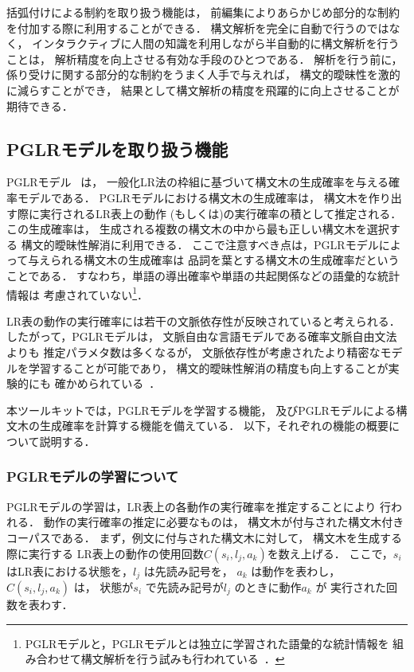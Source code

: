 括弧付けによる制約を取り扱う機能は，
前編集によりあらかじめ部分的な制約を付加する際に利用することができる．
構文解析を完全に自動で行うのではなく，
インタラクティブに人間の知識を利用しながら半自動的に構文解析を行うことは，
解析精度を向上させる有効な手段のひとつである．
解析を行う前に，係り受けに関する部分的な制約をうまく人手で与えれば，
構文的曖昧性を激的に減らすことができ，
結果として構文解析の精度を飛躍的に向上させることが期待できる．


\subsection{PGLRモデルを取り扱う機能}
\label{sec:pglr}

PGLRモデル~\cite{inui:98:a} は，
一般化LR法の枠組に基づいて構文木の生成確率を与える確率モデルである．
PGLRモデルにおける構文木の生成確率は，
構文木を作り出す際に実行されるLR表上の動作
(\shact もしくは\react )の実行確率の積として推定される．
この生成確率は，
生成される複数の構文木の中から最も正しい構文木を選択する
構文的曖昧性解消に利用できる．
ここで注意すべき点は，PGLRモデルによって与えられる構文木の生成確率は
品詞を葉とする構文木の生成確率だということである．
すなわち，単語の導出確率や単語の共起関係などの語彙的な統計情報は
考慮されていない\footnote{
  PGLRモデルと，PGLRモデルとは独立に学習された語彙的な統計情報を
  組み合わせて構文解析を行う試みも行われている~\cite{sirai:98:b}．
}．

LR表の動作の実行確率には若干の文脈依存性が反映されていると考えられる．
したがって，PGLRモデルは，
文脈自由な言語モデルである確率文脈自由文法よりも
推定パラメタ数は多くなるが，
文脈依存性が考慮されたより精密なモデルを学習することが可能であり，
構文的曖昧性解消の精度も向上することが実験的にも
確かめられている~\cite{sornlertlamvanich:99:a}．

本ツールキットでは，PGLRモデルを学習する機能，
及びPGLRモデルによる構文木の生成確率を計算する機能を備えている．
以下，それぞれの機能の概要について説明する．


\subsubsection{PGLRモデルの学習について}
\label{sec:pglr learning}

PGLRモデルの学習は，LR表上の各動作の実行確率を推定することにより
行われる．
動作の実行確率の推定に必要なものは，
構文木が付与された構文木付きコーパスである．
まず，例文に付与された構文木に対して，
構文木を生成する際に実行する
LR表上の動作の使用回数$C(s_i,l_j,a_k)$を数え上げる．
ここで，$s_i$ はLR表における状態を，$l_j$ は先読み記号を，
$a_k$ は動作を表わし，
$C(s_i,l_j,a_k)$ は，
状態が$s_i$ で先読み記号が$l_j$ のときに動作$a_k$ が
実行された回数を表わす．

